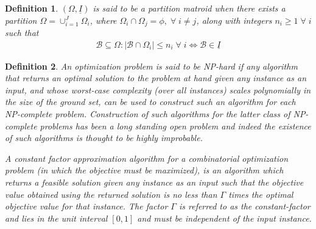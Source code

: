 \documentclass[11pt] {article}
\newcommand{\Bc} {{\mathcal B}}         \newcommand{\Bk} {{\bm {\mathcal B}}}
\newcommand{\Iul}  {{\underline I}}              \newcommand{\iul}  {{\underline i}}
\newtheorem{definition}{Definition}
\begin{document}
\begin{definition}
 $(\Omega,\Iul)$ is said to be
a {\em partition matroid} when   there exists a partition $\Omega=\cup_{i=1}^J\Omega_i$, where $\Omega_i\cap\Omega_j=\phi,\;\forall\;i\neq j$, along with integers $n_i\geq 1\;\forall\;i$ such that
\begin{eqnarray}
 \Bc\subseteq\Omega: |\Bc\cap\Omega_i|\leq n_i\;\forall\;i \Leftrightarrow \Bc\in\Iul
  \end{eqnarray}
\end{definition}
\begin{definition}
An optimization problem is said to be {\em NP-hard} if   any algorithm that returns an optimal solution to the problem at hand given any instance as an input, and whose worst-case complexity (over all instances) scales polynomially in the size of the ground set, can be used to construct such an algorithm for each NP-complete problem. Construction of such algorithms for the latter class of NP-complete problems has been a long standing open problem \cite{Karp_NP72} and indeed the existence of such algorithms is thought to be highly improbable.




A {\em constant factor  approximation algorithm} for a combinatorial optimization problem (in which the objective must be maximized), is an algorithm which returns a feasible solution   given any instance as an input such that the objective value obtained using the returned solution is no less than $\Gamma$ times the optimal objective value for that instance. The factor $\Gamma$ is referred to as the constant-factor and lies in the unit interval  $[0,1]$ and must be independent of the input instance. \end{definition}
\end{document}
